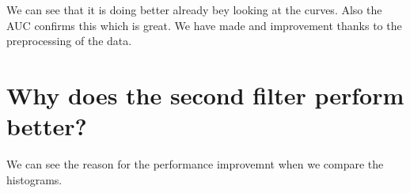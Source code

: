 \documentclass[letterpaper,10pt,english]{sphinxmanual}
\begin{document}
\begin{sphinxVerbatim}[commandchars=\\\{\}]
\end{sphinxVerbatim}

\noindent{}

\sphinxAtStartPar
We can see that it is doing better already bey looking at the curves. Also the AUC confirms this which is great. We have made and improvement thanks to the preprocessing of the data.


\section{Why does the second filter perform better?}
\label{\detokenize{05-AdvancedSegmentation:why-does-the-second-filter-perform-better}}
\sphinxAtStartPar
We can see the reason for the performance improvemnt when we compare the histograms.
\end{document}

